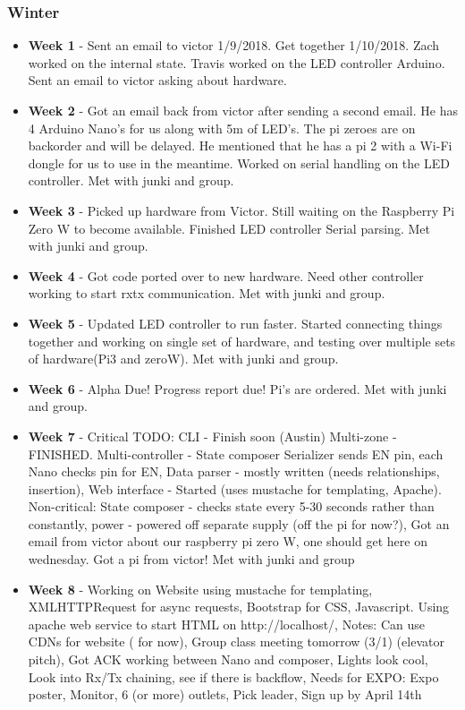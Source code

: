 \documentclass[onecolumn, draftclsnofoot,10pt, compsoc]{IEEEtran}
\begin{document}
			\subsubsection{Winter}
				\begin{itemize}
					\item \textbf{Week 1} - Sent an email to victor 1/9/2018. Get together 1/10/2018. Zach worked on the internal state. Travis worked on the LED controller Arduino. Sent an email to victor asking about hardware.
					\item \textbf{Week 2} - Got an email back from victor after sending a second email. He has 4 Arduino Nano's for us along with 5m of LED's. The pi zeroes are on backorder and will be delayed. He mentioned that he has a pi 2 with a Wi-Fi dongle for us to use in the meantime. Worked on serial handling on the LED controller. Met with junki and group.
					\item \textbf{Week 3} - Picked up hardware from Victor. Still waiting on the Raspberry Pi Zero W to become available. Finished LED controller Serial parsing. Met with junki and group.
					\item \textbf{Week 4} - Got code ported over to new hardware. Need other controller working to start rxtx communication. Met with junki and group.
					\item \textbf{Week 5} - Updated LED controller to run faster. Started connecting things together and working on single set of hardware, and testing over multiple sets of hardware(Pi3 and zeroW). Met with junki and group.
					\item \textbf{Week 6} - Alpha Due! Progress report due! Pi's are ordered. Met with junki and group.
					\item \textbf{Week 7} - Critical TODO: CLI - Finish soon (Austin) Multi-zone - FINISHED. Multi-controller - State composer Serializer sends EN pin, each Nano checks pin for EN, Data parser - mostly written (needs relationships, insertion), Web interface - Started (uses mustache for templating, Apache). Non-critical: State composer - checks state every 5-30 seconds rather than constantly, power - powered off separate supply (off the pi for now?), Got an email from victor about our raspberry pi zero W, one should get here on wednesday. Got a pi from victor! Met with junki and group
					\item \textbf{Week 8} - Working on Website using mustache for templating, XMLHTTPRequest for async requests,  Bootstrap for CSS, Javascript. Using apache web service to start HTML on http://localhost/, Notes: Can use CDNs for website ( for now), Group class meeting tomorrow (3/1) (elevator pitch), Got ACK working between Nano and composer, Lights look cool, Look into Rx/Tx chaining, see if there is backflow, Needs for EXPO: Expo poster, Monitor, 6 (or more) outlets, Pick leader, Sign up by April 14th

\end{itemize}
\end{document}
